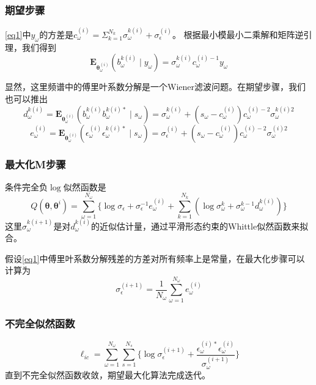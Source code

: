 \subsubsection{期望步骤}
\eqref{eq1}中$y_\omega$的方差是$c_\omega^{(i)}=\Sigma_{k=1}^{N_k}\sigma_\omega^{k(i)}+\sigma_\epsilon^{(i)}$。 根据最小模最小二乘解和矩阵逆引理，我们得到
\begin{equation}\label{eq5}
\mathbf{E}_{\mathbf{\theta}_\omega^{(i)}}(b_\omega^{k(i)}\mid{y}_\omega)=\sigma_\omega^{k(i)}c_\omega^{(i)-1}y_\omega
\end{equation}

显然，这里频谱中的傅里叶系数分解是一个Wiener滤波问题。在期望步骤，我们也可以推出
\begin{equation}\label{eq6}
d_\omega^{k(i)}=\mathbf{E}_{\mathbf{\theta}_\omega^{(i)}}(b_\omega^{k(i)}b_\omega^{k(i)*}\mid{s}_\omega)=\sigma_\omega^{k(i)}+(s_\omega-c_\omega^{(i)})c_\omega^{(i)-2}\sigma_\omega^{k(i)2}
\end{equation}
\begin{equation}\label{eq7}
e_\omega^{(i)}=\mathbf{E}_{\mathbf{\theta}_\omega^{(i)}}(\epsilon_\omega^{(i)}\epsilon_\omega^{k(i)*}\mid{s}_\omega)=\sigma_\epsilon^{(i)}+(s_\omega-c_\omega^{(i)})c_\omega^{(i)-2}\sigma_\omega^{(i)2}
\end{equation}

\subsubsection{最大化M步骤}
条件完全负$\log$似然函数是
\begin{equation}\label{eq8}
Q(\mathbf{\theta},\mathbf{\theta}^{i})=\sum_{\omega=1}^{N_\omega}\lbrace\log{\sigma_\epsilon}+\sigma_\epsilon^{-1}e_\omega^{(i)}+\sum_{k=1}^{N_k}(\log{\sigma}_\omega^k+\sigma_\omega^{k-1}d_\omega^{k(i)})\rbrace
\end{equation}
这里$\sigma_\omega^{k(i+1)}$是对$d_\omega^{k(i)}$的近似估计量，通过平滑形态约束的Whittle似然函数来拟合。

假设\eqref{eq1}中傅里叶系数分解残差的方差对所有频率上是常量，在最大化步骤可以计算为
\begin{equation}\label{eq9}
\sigma_\epsilon^{(i+1)}=\frac{1}{N_\omega}\sum_{\omega=1}^{N_\omega}e_\omega^{(i)}
\end{equation}

\subsubsection{不完全似然函数}
\begin{equation}\label{eq10}
\ell_{ic}=\sum_{\omega=1}^{N_\omega}\sum_{s=1}^{N_s}\lbrace\log{\sigma_\epsilon^{(i+1)}}+\frac{\epsilon_\omega^{(i)*}\epsilon_\omega^{(i)}}{\sigma_\omega^{(i+1)}}\rbrace
\end{equation}
直到不完全似然函数收敛，期望最大化算法完成迭代。

